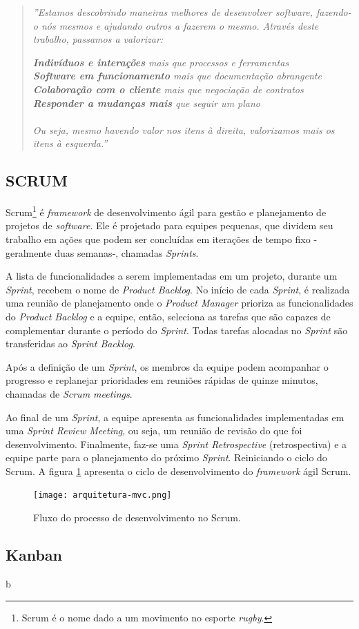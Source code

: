 \begin{quote}
    \textit{''Estamos descobrindo maneiras melhores de desenvolver software, fazendo-o nós mesmos e ajudando outros a 
    fazerem o mesmo. Através deste trabalho, passamos a valorizar:}
    
        \textit{\textbf{Indivíduos e interações} mais que processos e ferramentas \\
        \textbf{Software em funcionamento} mais que documentação abrangente \\
        \textbf{Colaboração com o cliente} mais que negociação de contratos \\
        \textbf{Responder a mudanças mais} que seguir um plano \\}
        \\
        \textit{Ou seja, mesmo havendo valor nos itens à direita, valorizamos mais os itens à esquerda.''}
\end{quote}


\subsection{SCRUM}
\label{fundSWSCRUM}

Scrum\footnote{Scrum é o nome dado a um movimento no esporte \textit{rugby}.} é \textit{framework} de desenvolvimento ágil para gestão e planejamento de projetos de \textit{software}. Ele é projetado para equipes pequenas, que dividem seu trabalho em ações que podem ser concluídas em iterações de tempo fixo -geralmente duas semanas-, chamadas \textit{Sprints}. \cite{pressman}

A lista de funcionalidades a serem implementadas em um projeto, durante um \textit{Sprint}, recebem o nome de \textit{Product Backlog}. No início de cada \textit{Sprint}, é realizada uma reunião de planejamento onde o \textit{Product Manager}  prioriza as funcionalidades do \textit{Product Backlog} e a equipe, então, seleciona as tarefas que são capazes de complementar durante o período do \textit{Sprint}. Todas tarefas alocadas no \textit{Sprint} são transferidas ao \textit{Sprint Backlog}.

Após a definição de um \textit{Sprint}, os membros da equipe podem acompanhar o progresso e replanejar prioridades em reuniões rápidas de quinze minutos, chamadas de \textit{Scrum meetings}.

Ao final de um \textit{Sprint}, a equipe apresenta as funcionalidades implementadas em uma \textit{Sprint Review Meeting}, ou seja, um reunião de revisão do que foi desenvolvimento. Finalmente, faz-se uma \textit{Sprint Retrospective} (retrospectiva) e a equipe parte para o planejamento do próximo \textit{Sprint}. Reiniciando o ciclo do Scrum. A figura \ref{scrumFlow} apresenta o ciclo de desenvolvimento do \textit{framework} ágil Scrum.

\begin{figure}[ht]
    \caption{Fluxo do processo de desenvolvimento no Scrum.}
       	\begin{center}
            \texttt{[image: arquitetura-mvc.png]}
        \end{center}
    \label{scrumFlow}
\end{figure}

\subsection{Kanban}
\label{fundSWSCRUM}

b